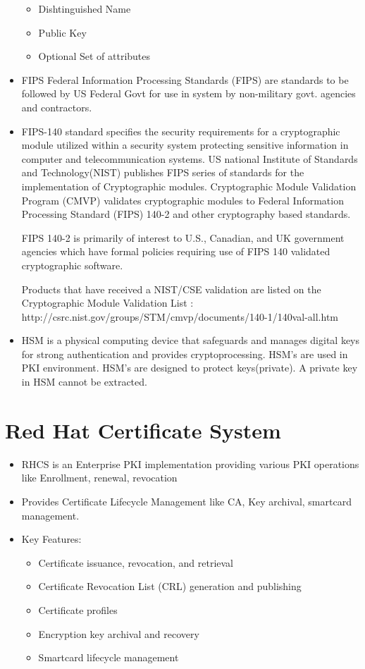 \documentclass[12pt]{report}
\begin{document}
\begin{itemize}
\begin{itemize}
            \item Dishtinguished Name
            \item Public Key
            \item Optional Set of attributes
        \end{itemize}
    \item FIPS
        Federal Information Processing Standards (FIPS) are standards to be followed by US Federal Govt for use in system by non-military govt. agencies and contractors.  
    \item FIPS-140
        standard specifies the security requirements for a cryptographic module utilized within a security system protecting sensitive information in computer and telecommunication systems. US national Institute of Standards and Technology(NIST) publishes FIPS series of standards for the implementation of Cryptographic modules. Cryptographic Module Validation Program (CMVP) validates cryptographic modules to Federal Information Processing Standard (FIPS) 140-2 and other cryptography based standards. 

        FIPS 140-2 is primarily of interest to U.S., Canadian, and UK government agencies which have formal policies requiring use of FIPS 140 validated cryptographic software. ~\cite{nist:fips}

        Products that have received a NIST/CSE validation are listed on the Cryptographic Module Validation List : http://csrc.nist.gov/groups/STM/cmvp/documents/140-1/140val-all.htm
    \item HSM
        is a physical computing device that safeguards and manages digital keys for strong authentication and provides cryptoprocessing. HSM's are used in PKI environment. HSM's are designed to protect keys(private). A private key in HSM cannot be extracted.     
\end{itemize}
\section{Red Hat Certificate System}
    \begin{itemize}
        \item RHCS is an Enterprise PKI implementation providing various PKI operations like Enrollment, renewal, revocation
        \item Provides Certificate Lifecycle Management  like CA, Key archival, smartcard management. 
        \item Key Features:
            \begin{itemize}
                \item Certificate issuance, revocation, and retrieval 
                \item Certificate Revocation List (CRL) generation and publishing
                \item Certificate profiles
                \item Encryption key archival and recovery 
                \item Smartcard lifecycle management 
            \end{itemize}
    \end{itemize}
\end{document}

